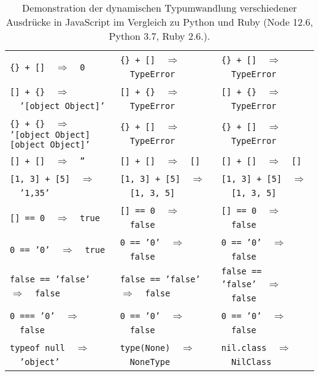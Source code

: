 \begin{table}[htb]
  \footnotesize
  \begin{tabu} to 
    \midrule
     &  &  \\
    \midrule
    \texttt{\{\} + []}~~$\Rightarrow$~~\texttt{0} & \texttt{\{\} + []}~~$\Rightarrow$~~\texttt{TypeError} & \texttt{\{\} + []}~~$\Rightarrow$~~\texttt{TypeError} \\
    \texttt{[] + \{\}}~~$\Rightarrow$~~\texttt{'[object Object]'} & \texttt{[] + \{\}}~~$\Rightarrow$~~\texttt{TypeError} & \texttt{[] + \{\}}~~$\Rightarrow$~~\texttt{TypeError} \\
    \texttt{\{\} + \{\}}~~$\Rightarrow$\newline\-\hspace{0.5cm}\texttt{'[object Object][object Object]'} & \texttt{\{\} + []}~~$\Rightarrow$~~\texttt{TypeError} & \texttt{\{\} + []}~~$\Rightarrow$~~\texttt{TypeError} \\
    \texttt{[] + []}~~$\Rightarrow$~~\texttt{''} & \texttt{[] + []}~~$\Rightarrow$~~\texttt{[]} & \texttt{[] + []}~~$\Rightarrow$~~\texttt{[]} \\
    \texttt{[1, 3] + [5]}~~$\Rightarrow$~~\texttt{'1,35'} & \texttt{[1, 3] + [5]}~~$\Rightarrow$~~\texttt{[1, 3, 5]} & \texttt{[1, 3] + [5]}~~$\Rightarrow$~~\texttt{[1, 3, 5]} \\
    \texttt{[] == 0}~~$\Rightarrow$~~\texttt{true} & \texttt{[] == 0}~~$\Rightarrow$~~\texttt{false} & \texttt{[] == 0}~~$\Rightarrow$~~\texttt{false} \\
    \texttt{0 == '0'}~~$\Rightarrow$~~\texttt{true} & \texttt{0 == '0'}~~$\Rightarrow$~~\texttt{false} & \texttt{0 == '0'}~~$\Rightarrow$~~\texttt{false} \\
    \texttt{false == 'false'}~~$\Rightarrow$~~\texttt{false} & \texttt{false == 'false'}~~$\Rightarrow$~~\texttt{false} & \texttt{false == 'false'}~~$\Rightarrow$~~\texttt{false} \\
    \texttt{0 === '0'}~~$\Rightarrow$~~\texttt{false} & \texttt{0 == '0'}~~$\Rightarrow$~~\texttt{false} & \texttt{0 == '0'}~~$\Rightarrow$~~\texttt{false} \\
    \texttt{typeof null}~~$\Rightarrow$~~\texttt{'object'} & \texttt{type(None)}~~$\Rightarrow$~~\texttt{NoneType} & \texttt{nil.class}~~$\Rightarrow$~~\texttt{NilClass} \\
    \midrule
  \end{tabu}
  \caption[Dynamische Typumwandlung verschiedener JavaScript-Ausdrücke im Vergleich zu Python und Ruby]{Demonstration der dynamischen Typumwandlung verschiedener Ausdrücke in JavaScript im Vergleich zu Python und Ruby (Node 12.6, Python 3.7, Ruby 2.6.).}
  \label{tab:js-type-coercion}
\end{table}

